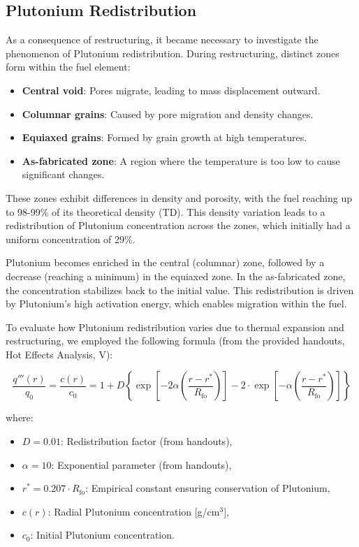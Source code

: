 \subsection{Plutonium Redistribution}

As a consequence of restructuring, it became necessary to investigate the phenomenon of Plutonium redistribution. During restructuring, distinct zones form within the fuel element:

\begin{itemize}
    \item \textbf{Central void}: Pores migrate, leading to mass displacement outward.
    \item \textbf{Columnar grains}: Caused by pore migration and density changes.
    \item \textbf{Equiaxed grains}: Formed by grain growth at high temperatures.
    \item \textbf{As-fabricated zone}: A region where the temperature is too low to cause significant changes.
\end{itemize}

These zones exhibit differences in density and porosity, with the fuel reaching up to 98-99\% of its theoretical density (TD). This density variation leads to a redistribution of Plutonium concentration across the zones, which initially had a uniform concentration of 29\%. 

Plutonium becomes enriched in the central (columnar) zone, followed by a decrease (reaching a minimum) in the equiaxed zone. In the as-fabricated zone, the concentration stabilizes back to the initial value. This redistribution is driven by Plutonium’s high activation energy, which enables migration within the fuel.

To evaluate how Plutonium redistribution varies due to thermal expansion and restructuring, we employed the following formula (from the provided handouts, Hot Effects Analysis, V):

\begin{equation}
    \frac{q'''(r)}{q_0} = \frac{c(r)}{c_0} = 1 + D \left\{ 
    \exp \left[ -2 \alpha \left( \frac{r - r^*}{R_\text{fo}} \right) \right] 
    - 2 \cdot \exp \left[ -\alpha \left( \frac{r - r^*}{R_\text{fo}} \right) \right]
    \right\}
\end{equation}

where:
\begin{itemize}
    \item $D = 0.01$: Redistribution factor (from handouts),
    \item $\alpha = 10$: Exponential parameter (from handouts),
    \item $r^* = 0.207 \cdot R_\text{fo}$: Empirical constant ensuring conservation of Plutonium,
    \item $c(r)$: Radial Plutonium concentration [g/cm\(^3\)],
    \item $c_0$: Initial Plutonium concentration.
\end{itemize}

